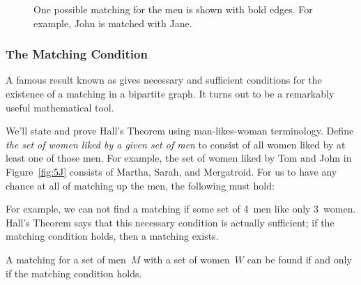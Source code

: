 \begin{figure}



\caption{One possible matching for the men is shown with bold edges.
  For example, John is matched with Jane.}

\label{fig:5K}

\end{figure}

\subsubsection{The Matching Condition}

A famous result known as  gives necessary
and sufficient conditions for the existence of a matching in a
bipartite graph.  It turns out to be a remarkably useful mathematical
tool.

We'll state and prove Hall's Theorem using man-likes-woman
terminology.  Define \emph{the set of women liked by a given set of
  men} to consist of all women liked by at least one of those men.
For example, the set of women liked by Tom and John in
Figure~\ref{fig:5J} consists of Martha, Sarah, and Mergatroid.  For us
to have any chance at all of matching up the men, the following
 must hold:

\medskip

\noindent{}

\medskip

For example, we can not find a matching if some set of 4~men like only
3~women.  Hall's Theorem says that this necessary condition is
actually sufficient; if the matching condition holds, then a matching
exists.

\begin{theorem}\label{thm:matching}
A matching for a set of men~$M$ with a set of women~$W$ can be found
if and only if the matching condition holds.
\end{theorem}


